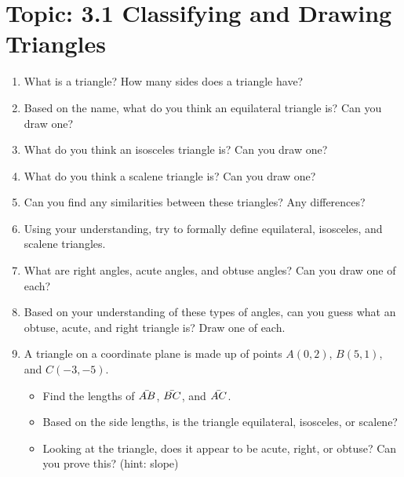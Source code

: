 \documentclass[12pt,letterpaper]{article}
\begin{document}
\section*{Topic: 3.1 Classifying and Drawing Triangles}
\begin{enumerate}[label=\arabic*.]
    \item What is a triangle? How many sides does a triangle have?
    \item Based on the name, what do you think an equilateral triangle is? Can you draw one?
    \item What do you think an isosceles triangle is? Can you draw one?
    \item What do you think a scalene triangle is? Can you draw one?
    \item Can you find any similarities between these triangles? Any differences?
    \item Using your understanding, try to formally define equilateral, isosceles, and scalene triangles.
    \item What are right angles, acute angles, and obtuse angles? Can you draw one of each?
    \item Based on your understanding of these types of angles, can you guess what an obtuse, acute, and right triangle is? Draw one of each.
    \item A triangle on a coordinate plane is made up of points $A(0, 2)$, $B(5, 1)$, and $C(-3, -5)$.
          \begin{itemize}
              \item Find the lengths of $\Bar{AB}$, $\Bar{BC}$, and $\Bar{AC}$.
              \item Based on the side lengths, is the triangle equilateral, isosceles, or scalene?
              \item Looking at the triangle, does it appear to be acute, right, or obtuse? Can you prove this? (hint: slope)
          \end{itemize}
\end{enumerate}
\end{document}
